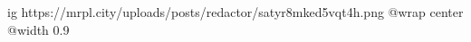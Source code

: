  
 
 
 
 

\ifcmt
  ig https://mrpl.city/uploads/posts/redactor/satyr8mked5vqt4h.png
  @wrap center
  @width 0.9
\fi
